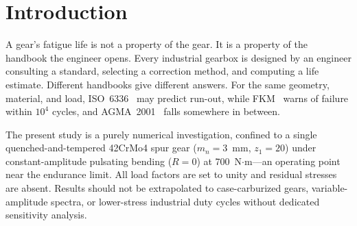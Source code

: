 \documentclass[12pt,a4paper]{article}
\begin{document}
\begin{abstract}
surface roughness rise to dominance near the endurance-limit
regime explored here. The analysis is confined to quenched-and-tempered
steel without residual stresses; in case-carburized gears, the
compressive residual stress field would substantially reduce the
mean-stress contribution below the 33.9\% reported here. Whereas prior
studies---including recent work in this
journal~\cite{bonaiti2024}---ask whether two standards produce different
predictions, this study asks how much each methodological switch contributes
to total log-variance relative to all others, by simultaneous factorial
decomposition across five dimensions. To my knowledge, no prior gear fatigue study has ranked the
sources of method-induced divergence in gear fatigue life prediction by
variance explained. Predicted fatigue life spans from $3.3\times10^2$ to
$3.1\times10^7$ cycles (5.0~dex).%
All formulas have been verified against the original standards (ISO~6336-3:2019, AGMA~2001-D04,
FKM~7th~ed.); S--N parameters are from the publicly accessible Waterloo
SMDIdbase.

\textbf{Keywords:} gear fatigue, uncertainty quantification, AFT survival analysis,
surface roughness, ISO 6336, AGMA 2001, FKM, S--N curve
\end{abstract}

\section{Introduction}
\label{sec:intro}

A gear's fatigue life is not a property of the gear. It is a property
of the handbook the engineer opens. Every industrial gearbox is designed
by an engineer consulting a standard, selecting a correction method, and
computing a life estimate. Different handbooks give different answers.
For the same geometry, material, and load, ISO~6336~\cite{iso6336} may
predict run-out, while FKM~\cite{fkm} warns of failure within $10^4$
cycles, and AGMA~2001~\cite{agma2001} falls somewhere in between.

The present study is a purely numerical investigation, confined to a
single quenched-and-tempered 42CrMo4 spur gear ($m_n=3$~mm,
$z_1=20$) under constant-amplitude pulsating bending ($R=0$) at
700~N$\cdot$m---an operating point near the endurance limit. All
load factors are set to unity and residual stresses are absent.
Results should not be extrapolated to case-carburized gears,
variable-amplitude spectra, or lower-stress industrial duty cycles
without dedicated sensitivity analysis.
\end{document}

